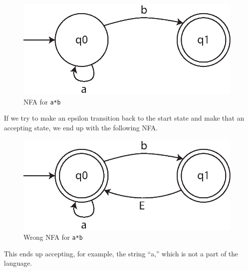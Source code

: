 \documentclass[10pt,letter]{article}
\begin{document}
\begin{figure}[h]
\centering
  \includegraphics[width=0.45\linewidth]{9i.eps}
  \caption{NFA for \texttt{a*b}}
  \label{fig:9i}
\end{figure}

If we try to make an epsilon transition back to the start state and make that an accepting state, we end up with the following NFA.

\begin{figure}[h]
\centering
  \includegraphics[width=0.45\linewidth]{9ii.eps}
  \caption{Wrong NFA for \texttt{a*b}}
  \label{fig:9ii}
\end{figure}

This ends up accepting, for example, the string ``a,'' which is not a part of the language.




\end{document}
